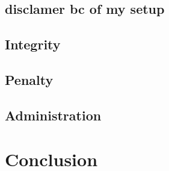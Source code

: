 \documentclass[titlepage, a4paper, 11pt]{scrartcl}
\begin{document}
        \subsection{disclamer bc of my setup}


        \subsection{Integrity}


        \subsection{Penalty}

        \subsection{Administration}

    \section{Conclusion}
    

            
    
\end{document}
